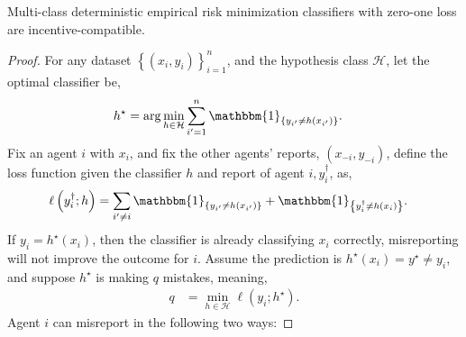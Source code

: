 \documentclass{article}
\begin{document}
\begin{prop} \label{prop:zolog} 
Multi-class deterministic empirical risk minimization classifiers with zero-one loss are incentive-compatible.
\end{prop}
\begin{proof} \label{proof:zologpf} 
For any dataset $\left\{\left(x_{i}, y_{i}\right)\right\}_{i=1}^{n}$, and the hypothesis class $\mathcal{H}$, let the optimal classifier be,
\begin{align*}
h^\star  &= \arg\displaystyle\min_{h \in \mathcal{H}} \displaystyle\sum_{i'=1}^{n} \mathbbm{1}_{\left\{y_{i'} \neq  h\left(x_{i'}\right)\right\}}.
\end{align*}
Fix an agent $i $ with $x_{i}$, and fix the other agents' reports, $\left(x_{-i}, y_{-i}\right)$, define the loss function given the classifier $h $ and report of agent $i , y^{\dagger}_{i}$, as,
\begin{align*}
\ell\left(y^{\dagger}_{i}; h\right) &= \displaystyle\sum_{i' \neq  i} \mathbbm{1}_{\left\{y_{i'} \neq  h\left(x_{i'}\right)\right\}} + \mathbbm{1}_{\left\{y^{\dagger}_{i} \neq  h\left(x_{i}\right)\right\}}.
\end{align*}
If $y_{i} = h^\star \left(x_{i}\right)$, then the classifier is already classifying $x_{i}$ correctly, misreporting will not improve the outcome for $i $. Assume the prediction is $h^\star \left(x_{i}\right) = y^\star  \neq  y_{i}$, and suppose $h^\star $ is making $q $ mistakes, meaning,
\begin{align*}
q  &= \displaystyle\min_{h \in \mathcal{H}} \ell\left(y_{i} ; h^\star \right).
\end{align*}
Agent $i $ can misreport in the following two ways:
\end{proof}
\end{document}
